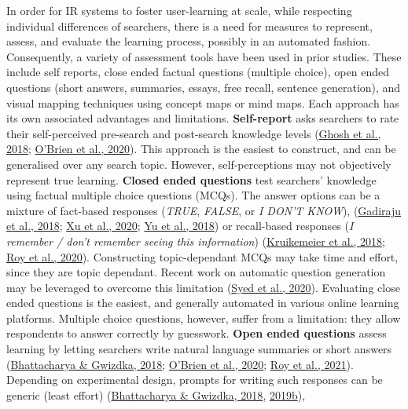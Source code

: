 \documentclass[a4paper, nobind]{templates/ociamthesis}
\begin{document}
In order for IR systems to foster user-learning at scale, while
respecting individual differences of searchers, there is a need for
measures to represent, assess, and evaluate the learning process,
possibly in an automated fashion. Consequently, a variety of assessment
tools have been used in prior studies. These include self reports, close
ended factual questions (multiple choice), open ended questions (short
answers, summaries, essays, free recall, sentence generation), and
visual mapping techniques using concept maps or mind maps. Each approach
has its own associated advantages and limitations. \textbf{Self-report} asks
searchers to rate their self-perceived pre-search and post-search
knowledge levels (\protect\hyperlink{ref-ghosh2018SearchingLearningExploring}{Ghosh et al., 2018}; \protect\hyperlink{ref-o2020role}{O'Brien et al., 2020}).
This approach is the easiest to construct, and can be generalised over
any search topic. However, self-perceptions may not objectively
represent true learning. \textbf{Closed ended questions} test searchers'
knowledge using factual multiple choice questions (MCQs). The answer
options can be a mixture of fact-based responses (\emph{TRUE}, \emph{FALSE}, or \emph{I
DON'T KNOW}),
(\protect\hyperlink{ref-gadiraju2018AnalyzingKnowledgeGain}{Gadiraju et al., 2018}; \protect\hyperlink{ref-xu2020does}{Xu et al., 2020}; \protect\hyperlink{ref-yu2018PredictingUserKnowledgea}{Yu et al., 2018})
or recall-based responses (\emph{I remember / don't remember seeing this
information}) (\protect\hyperlink{ref-kruikemeier2018learning}{Kruikemeier et al., 2018}; \protect\hyperlink{ref-roy2020exploring}{Roy et al., 2020}).
Constructing topic-dependant MCQs may take time and effort, since they
are topic dependant. Recent work on automatic question generation may be
leveraged to overcome this limitation (\protect\hyperlink{ref-syed2020improving}{Syed et al., 2020}). Evaluating
close ended questions is the easiest, and generally automated in various
online learning platforms. Multiple choice questions, however, suffer
from a limitation: they allow respondents to answer correctly by
guesswork. \textbf{Open ended questions} assess learning by letting searchers
write natural language summaries or short answers
(\protect\hyperlink{ref-bhattacharya2018relating}{Bhattacharya \& Gwizdka, 2018}; \protect\hyperlink{ref-o2020role}{O'Brien et al., 2020}; \protect\hyperlink{ref-roy2021note}{Roy et al., 2021}). Depending on
experimental design, prompts for writing such responses can be generic
(least effort) (\protect\hyperlink{ref-bhattacharya2018relating}{Bhattacharya \& Gwizdka, 2018}, \protect\hyperlink{ref-bhattacharya2019measuring}{2019b}),
\end{document}
